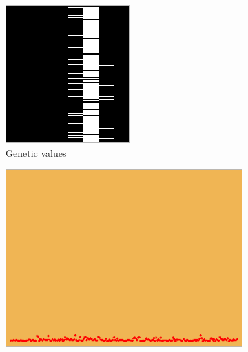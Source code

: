 \documentclass[a4paper,12pt]{report}
\begin{document}
 \begin{figure}[h]
    \centering
    \begin{subfigure}[b]{0.3\linewidth} 
        \includegraphics[width=\linewidth, height =\linewidth]{Exo_Genome}
        \caption{Genetic values}
    \end{subfigure}
    \begin{subfigure}[b]{0.3\linewidth}
        \includegraphics[width=\linewidth, height = \linewidth]{Exo_Field}

\end{subfigure}
\end{figure}
\end{document}
